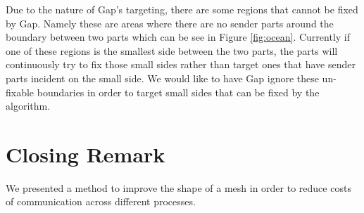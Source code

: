\documentclass{thesis}
\begin{document}
Due to the nature of Gap's targeting, there are some regions that cannot be 
fixed by Gap. Namely these are areas where there are no sender parts around 
the boundary between two parts which can be see in Figure \ref{fig:ocean}. 
Currently if one of these regions is the smallest side between the two parts, 
the parts will continuously try to fix those small sides rather than target 
ones that have sender parts incident on the small side. We would like to have 
Gap ignore these un-fixable boundaries in order to target small sides that can 
be fixed by the algorithm.




\chapter{Closing Remark}

We presented a method to improve the shape of a mesh in order to reduce costs of communication across different processes.

\begin{singlespace}
\begin{thebibliography}{99}
\end{thebibliography}
\end{singlespace}




\end{document}
